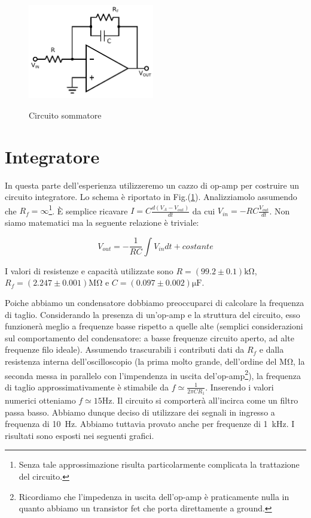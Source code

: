 \begin{figure}
	\caption{Circuito sommatore}
	\includegraphics[width=55mm]{ccint.pdf}
	\label{fig:ccsum}
\end{figure}

\section{Integratore}

In questa parte dell'esperienza utilizzeremo un cazzo di op-amp per costruire un circuito integratore. Lo schema è riportato in Fig.(\ref{}). Analizziamolo assumendo che $R_f=\infty$\footnote{Senza tale approssimazione risulta particolarmente complicata la trattazione del circuito.}. È semplice ricavare $I=C\frac{d(V_A-V_{out})}{dt}$ da cui $V_{in}=-RC\frac{V_{out}}{dt}$. Non siamo matematici ma la seguente relazione è triviale:

\begin{equation}
V_{out}=-\frac{1}{RC} \int V_{in}dt +costante
\label{eq:int}
\end{equation}

I valori di resistenze e capacità utilizzate sono $R=(99.2 \pm 0.1)\si{\kilo\ohm}$, $R_f=(2.247 \pm 0.001)\si{\mega\ohm}$ e $C=(0.097 \pm 0.002) \si{\micro\farad}$. 

Poiche abbiamo un condensatore dobbiamo preoccuparci di calcolare la frequenza di taglio. Considerando la presenza di un'op-amp e la struttura del circuito, esso funzionerà meglio a frequenze basse rispetto a quelle alte (semplici considerazioni sul comportamento del condensatore: a basse frequenze circuito aperto, ad alte frequenze filo ideale). Assumendo trascurabili i contributi dati da $R_f$ e dalla resistenza interna dell'oscilloscopio (la prima molto grande, dell'ordine del $\si{\mega\ohm}$, la seconda messa in parallelo con l'impendenza in uscita del'op-amp\footnote{Ricordiamo che l'impedenza in uscita dell'op-amp è praticamente nulla in quanto abbiamo un transistor fet che porta direttamente a ground.}), la frequenza di taglio approssimativamente è stimabile da $f\simeq \frac{1}{2\pi C R_1}$. Inserendo i valori numerici otteniamo $f \simeq 15 \si{\hertz}$. Il circuito si comporterà all'incirca come un filtro passa basso. Abbiamo dunque deciso di utilizzare dei segnali in ingresso a frequenza di \SI{10}{\hertz}. Abbiamo tuttavia provato anche per frequenze di \SI{1}{\kilo\hertz}. I risultati sono esposti nei seguenti grafici.



